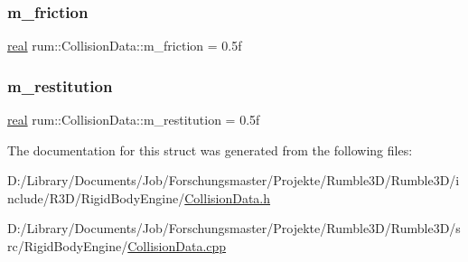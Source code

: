 \subsubsection{\texorpdfstring{m\+\_\+friction}{m\_friction}}
{\footnotesize\ttfamily \mbox{\hyperlink{namespacerum_a7e8cca23573d5eaead0f138cbaa4862c}{real}} rum\+::\+Collision\+Data\+::m\+\_\+friction = 0.\+5f\hspace{0.3cm}{\ttfamily [protected]}}

\mbox{\label{classrum_1_1_collision_data_ab28c985d5b8554f548a485cac367c1fd}} 
\subsubsection{\texorpdfstring{m\+\_\+restitution}{m\_restitution}}
{\footnotesize\ttfamily \mbox{\hyperlink{namespacerum_a7e8cca23573d5eaead0f138cbaa4862c}{real}} rum\+::\+Collision\+Data\+::m\+\_\+restitution = 0.\+5f\hspace{0.3cm}{\ttfamily [protected]}}



The documentation for this struct was generated from the following files\+:\begin{DoxyCompactItemize}
\item 
D\+:/\+Library/\+Documents/\+Job/\+Forschungsmaster/\+Projekte/\+Rumble3\+D/\+Rumble3\+D/include/\+R3\+D/\+Rigid\+Body\+Engine/\mbox{\hyperlink{_collision_data_8h}{Collision\+Data.\+h}}\item 
D\+:/\+Library/\+Documents/\+Job/\+Forschungsmaster/\+Projekte/\+Rumble3\+D/\+Rumble3\+D/src/\+Rigid\+Body\+Engine/\mbox{\hyperlink{_collision_data_8cpp}{Collision\+Data.\+cpp}}\end{DoxyCompactItemize}
